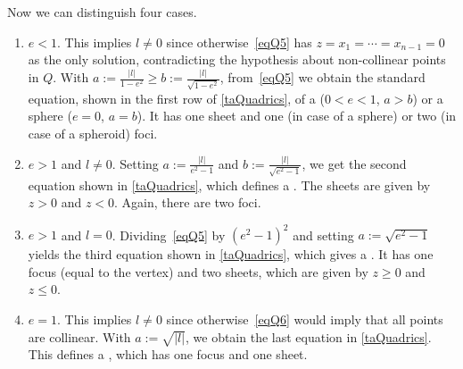 \documentclass[reqno]{amsart}
\begin{document}
Now we can distinguish four cases.
\begin{enumerate}[label= \bf Case \arabic*:, ref= \arabic*, align=left]
\item \label{case1} $e < 1$. This implies $l \ne 0$ since
  otherwise~\eqref{eqQ5} has $z = x_1 = \cdots = x_{n-1} = 0$ as the
  only solution, contradicting the hypothesis about non-collinear
  points in $Q$. With
  $a := \frac{|l|}{1 - e^2} \ge b := \frac{|l|}{\sqrt{1 - e^2}}$,
  from~\eqref{eqQ5} we obtain the standard equation, shown in the
  first row of \cref{taQuadrics},
  of a  ($0 < e < 1$, $a > b$) or a sphere ($e = 0$,
  $a = b$). It has one sheet and one (in case of a sphere) or two (in
  case of a spheroid) foci.
\item \label{case2} $e > 1$ and $l \ne 0$. Setting
  $a := \frac{|l|}{e^2 - 1}$ and $b := \frac{|l|}{\sqrt{e^2 - 1}}$, we
  get the second equation shown in \cref{taQuadrics},
  which defines a . The sheets
  are given by $z > 0$ and $z < 0$. Again, there are two foci.
\item \label{case3} $e > 1$ and $l = 0$. Dividing~\eqref{eqQ5} by
  $(e^2 - 1)^2$ and setting $a := \sqrt{e^2 - 1}$ yields the third
  equation shown in \cref{taQuadrics}, which
  gives a . It has one focus (equal to the vertex)
  and two sheets, which are given by $z \ge 0$ and $z \le 0$.
\item \label{case4} $e = 1$. This implies $l \ne 0$ since
  otherwise~\eqref{eqQ6} would imply that all points are
  collinear. With $a := \sqrt{|l|}$, we obtain the last equation in
  \cref{taQuadrics}.
  This defines a , which has one focus and one
  sheet.
\end{enumerate}
\end{document}

